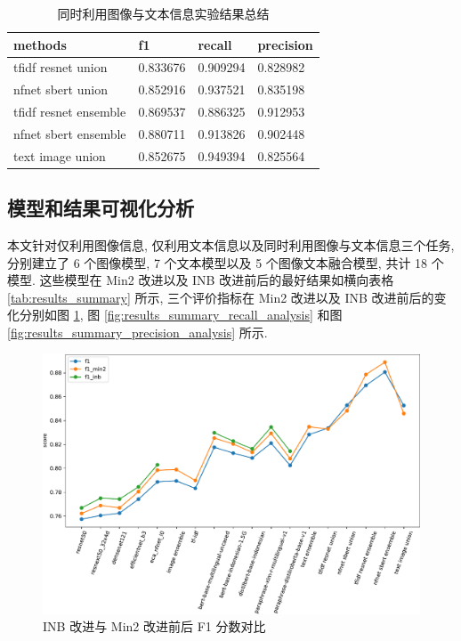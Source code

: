 \documentclass[12pt]{article}
\begin{document}
\begin{table}[htbp]
  \centering
  \caption{同时利用图像与文本信息实验结果总结}
  \label{tab:image_text_results_analysis}
  \begin{tabular}{llll}
    \toprule
    methods & f1       & recall   & precision \\
    \midrule
    tfidf resnet union    & 0.833676 & 0.909294 & 0.828982  \\
    nfnet sbert union     & 0.852916 & 0.937521 & 0.835198  \\
    tfidf resnet ensemble & 0.869537 & 0.886325 & 0.912953  \\
    nfnet sbert ensemble  & 0.880711 & 0.913826 & 0.902448  \\
    text image union      & 0.852675 & 0.949394 & 0.825564  \\
    \bottomrule
  \end{tabular}
\end{table}

\subsection{模型和结果可视化分析}

本文针对仅利用图像信息, 仅利用文本信息以及同时利用图像与文本信息三个任务, 分别建立了 6 个图像模型, 7 个文本模型以及 5 个图像文本融合模型, 共计 18 个模型. 这些模型在 Min2 改进以及 INB 改进前后的最好结果如横向表格 \ref{tab:results_summary} 所示, 三个评价指标在 Min2 改进以及 INB 改进前后的变化分别如图 \ref{fig:results_summary_f1_analysis}, 图 \ref{fig:results_summary_recall_analysis} 和图 \ref{fig:results_summary_precision_analysis} 所示.

\begin{figure}[htbp]
  \centering
  \includegraphics[width=14cm]{results_plot_f1_df.pdf}
  \caption{INB 改进与 Min2 改进前后 F1 分数对比}
  \label{fig:results_summary_f1_analysis}
\end{figure}
\end{document}
